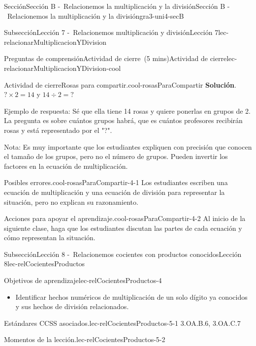 \documentclass[oneside,10pt,]{article}
\newcommand{\blocktitlefont}{\relax}
\begin{document}
\begin{sectionptx}{Sección}{Sección B -~Relacionemos la multiplicación y la división}{}{Sección B -~Relacionemos la multiplicación y la división}{}{}{gra3-uni4-secB}
\begin{subsectionptx}{Subsección}{Lección 7 -~Relacionemos multiplicación y división}{}{Lección 7}{}{}{lec-relacionarMultiplicacionYDivision}
\begin{reading-questions-subsubsection}{Preguntas de comprensión}{Actividad de cierre~(5 mins)}{}{Actividad de cierre}{}{}{lec-relacionarMultiplicacionYDivision-cool}
\begin{project}{Actividad de cierre}{Rosas para compartir.}{cool-rosasParaCompartir}
\noindent\textbf{\blocktitlefont Solución}.\hypertarget{cool-rosasParaCompartir-3}{}\quad{}\(?\times 2 = 14\) y \(14\div 2=?\)%
\par
Ejemplo de respuesta: Sé que ella tiene 14 rosas y quiere ponerlas en grupos de 2. La pregunta es sobre cuántos grupos habrá, que es cuántos profesores recibirán rosas y está representado por el "?".%
\par
Nota: Es muy importante que los estudiantes expliquen con precisión que conocen el tamaño de los grupos, pero no el número de grupos. Pueden invertir los factores en la ecuación de multiplicación.%
\end{project}%
\par
\begin{paragraphs}{Posibles errores.}{cool-rosasParaCompartir-4-1}%
Los estudiantes escriben una ecuación de multiplicación y una ecuación de división para representar la situación, pero no explican su razonamiento.%
\end{paragraphs}%
\begin{paragraphs}{Acciones para apoyar el aprendizaje.}{cool-rosasParaCompartir-4-2}%
Al inicio de la siguiente clase, haga que los estudiantes discutan las partes de cada ecuación y cómo representan la situación.%
\end{paragraphs}%
\end{reading-questions-subsubsection}
\end{subsectionptx}
%
%
\typeout{************************************************}
\typeout{************************************************}
%
\begin{subsectionptx}{Subsección}{Lección 8 -~Relacionemos cocientes con productos conocidos}{}{Lección 8}{}{}{lec-relCocientesProductos}
\begin{objectives}{Objetivos de aprendizaje}{lec-relCocientesProductos-4}
%
\begin{itemize}[label=\textbullet]
\item{}Identificar hechos numéricos de multiplicación de un solo dígito ya conocidos y sus hechos de división relacionados.%
\end{itemize}
\end{objectives}
\begin{introduction}{}%
\begin{paragraphs}{Estándares CCSS asociados.}{lec-relCocientesProductos-5-1}%
3.OA.B.6, 3.OA.C.7%
\end{paragraphs}%
\begin{paragraphs}{Momentos de la lección.}{lec-relCocientesProductos-5-2}%

\end{paragraphs}
\end{introduction}
\end{subsectionptx}
\end{sectionptx}
\end{document}
